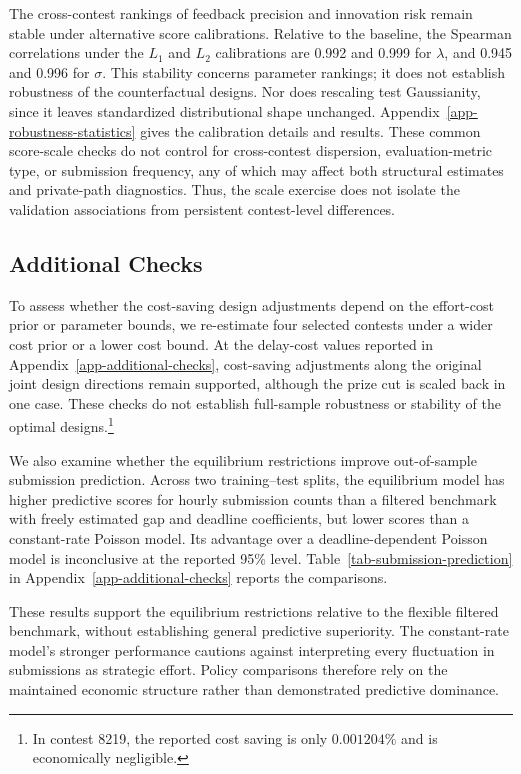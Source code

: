 \documentclass[mnsc]{informs3}
\begin{document}
The cross-contest rankings of feedback precision and innovation risk remain stable under alternative score calibrations. Relative to the baseline, the Spearman correlations under the $L_1$ and $L_2$ calibrations are 0.992 and 0.999 for $\lambda$, and 0.945 and 0.996 for $\sigma$. This stability concerns parameter rankings; it does not establish robustness of the counterfactual designs. Nor does rescaling test Gaussianity, since it leaves standardized distributional shape unchanged. Appendix~\ref{app-robustness-statistics} gives the calibration details and results.
{These common score-scale checks do not control for cross-contest dispersion, evaluation-metric type, or submission frequency, any of which may affect both structural estimates and private-path diagnostics. Thus, the scale exercise does not isolate the validation associations from persistent contest-level differences.}



\subsection{Additional Checks}\label{sect-additional-checks}

To assess whether the cost-saving design adjustments depend on the effort-cost prior or parameter bounds, we re-estimate four selected contests under a wider cost prior or a lower cost bound. At the delay-cost values reported in Appendix~\ref{app-additional-checks}, cost-saving adjustments along the original joint design directions remain supported, although the prize cut is scaled back in one case. These checks do not establish full-sample robustness or stability of the optimal designs.\footnote{In contest 8219, the reported cost saving is only $0.001204\%$ and is economically negligible.}

We also examine whether the equilibrium restrictions improve out-of-sample submission prediction. Across two training--test splits, the equilibrium model has higher predictive scores for hourly submission counts than a filtered benchmark with freely estimated gap and deadline coefficients, but lower scores than a constant-rate Poisson model. Its advantage over a deadline-dependent Poisson model is inconclusive at the reported 95\% level. Table~\ref{tab-submission-prediction} in Appendix~\ref{app-additional-checks} reports the comparisons.

These results support the equilibrium restrictions relative to the flexible filtered benchmark, without establishing general predictive superiority. The constant-rate model's stronger performance cautions against interpreting every fluctuation in submissions as strategic effort. Policy comparisons therefore rely on the maintained economic structure rather than demonstrated predictive dominance.
\end{document}
